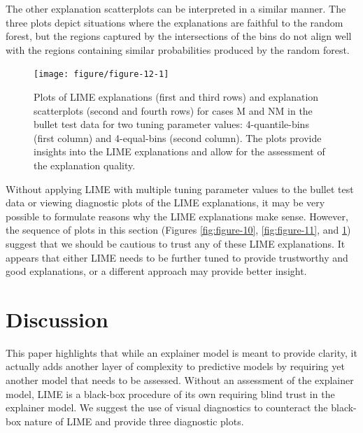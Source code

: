 \documentclass[AMS,STIX2COL]{WileyNJD-v2}\usepackage[]{graphicx}\usepackage[]{color}
\newenvironment{knitrout}{}{} %
\begin{document}
The other explanation scatterplots can be interpreted in a similar manner. The three plots depict situations where the explanations are faithful to the random forest, but the regions captured by the intersections of the bins do not align well with the regions containing similar probabilities produced by the random forest.

\begin{figure}[!thp]
\begin{knitrout}
\color{fgcolor}

{\centering \texttt{[image: figure/figure-12-1]} 

}



\end{knitrout}
\caption{Plots of LIME explanations (first and third rows) and explanation scatterplots (second and fourth rows) for  cases M and NM in the bullet test data for two tuning parameter values: 4-quantile-bins (first column) and 4-equal-bins (second column).  The plots provide insights into the LIME explanations and allow for the assessment of the explanation quality.}
\label{fig:figure-12}
\end{figure}

Without applying LIME with multiple tuning parameter values to the bullet test data or viewing diagnostic plots of the LIME explanations, it may be very possible to formulate reasons why the LIME explanations make sense. However, the sequence of plots in this section (Figures \ref{fig:figure-10}, \ref{fig:figure-11}, and \ref{fig:figure-12}) suggest that we should be cautious to trust any of these LIME explanations. It appears that either LIME needs to be further tuned to provide trustworthy and good explanations, or a different approach may provide better insight. 

\section{Discussion} \label{discussion}

This paper highlights that while an explainer model is meant to provide clarity, it actually adds another layer of complexity to predictive models by requiring yet another model that needs to be assessed. Without an assessment of the explainer model, LIME is a black-box procedure of its own requiring blind trust in the explainer model. We suggest the use of visual diagnostics to counteract the black-box nature of LIME and provide three diagnostic plots.
\end{document}
